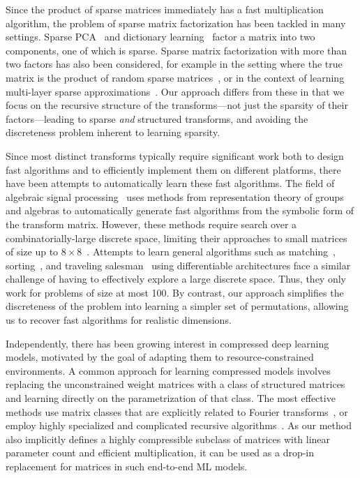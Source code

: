 Since the product of sparse matrices immediately has a fast multiplication algorithm, the problem of sparse matrix factorization has been tackled in many settings. Sparse PCA~\citep{zou2006sparse} and dictionary learning~\citep{mairal2009supervised} factor a matrix into two components, one of which is sparse. Sparse matrix factorization with more than two factors has also been considered, for example in the setting where the true matrix is the product of random sparse matrices~\citep{neyshabur2013sparse}, or in the context of learning multi-layer sparse approximations~\citep{lemagoarou2015chasing,lemagoarou2016flexible}. Our approach differs from these in that we focus on the recursive structure of the transforms---not just the sparsity of their factors---leading to sparse \emph{and} structured transforms, and avoiding the discreteness problem inherent to learning sparsity.

Since most distinct transforms typically require significant work both to design fast algorithms and to efficiently implement them on different platforms, there have been attempts to automatically learn these fast algorithms. The field of algebraic signal processing~\citep{puschel2008algebraic} uses methods from representation theory of groups and algebras to automatically generate fast algorithms from the symbolic form of the transform matrix. However, these methods require search over a combinatorially-large discrete space, limiting their approaches to small matrices of size up to $8 \times 8$~\citep{egner2004symmetry,voronenko2009algebraic}. Attempts to learn general algorithms such as matching~\citep{mena2018learning}, sorting~\citep{grover2019stochastic}, and traveling salesman~\citep{bello2016neural} using differentiable architectures face a similar challenge of having to effectively explore a large discrete space. Thus, they only work for problems of size at most 100. By contrast, our approach simplifies the discreteness of the problem into learning a simpler set of permutations, allowing us to recover fast algorithms for realistic dimensions.

Independently, there has been growing interest in compressed deep learning models, motivated by the goal of adapting them to resource-constrained environments. A common approach for learning compressed models involves replacing the unconstrained weight matrices with a class of structured matrices and learning directly on the parametrization of that class. The most effective methods use matrix classes that are explicitly related to Fourier transforms~\cite{sindhwani2015structured}, or employ highly specialized and complicated recursive algorithms~\cite{thomas2018learning}. As our method also implicitly defines a highly compressible subclass of matrices with linear parameter count and efficient multiplication, it can be used as a drop-in replacement for matrices in such end-to-end ML models.

